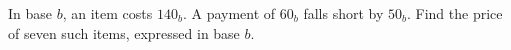 In base $b$, an item costs $140_b$. A payment of $60_b$ falls short by $50_b$. Find the price of seven such items, expressed in base $b$.
